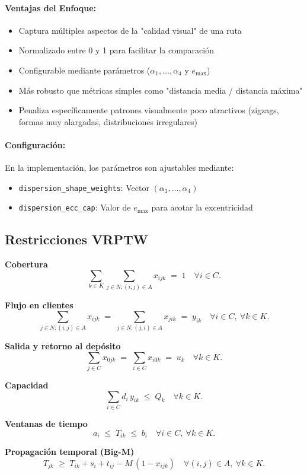 \documentclass[11pt, a4paper]{article}
\begin{document}
\paragraph{Ventajas del Enfoque:}
\begin{itemize}
\item Captura múltiples aspectos de la "calidad visual" de una ruta
\item Normalizado entre 0 y 1 para facilitar la comparación
\item Configurable mediante parámetros ($\alpha_1,\dots,\alpha_4$ y $e_{\max}$)
\item Más robusto que métricas simples como "distancia media / distancia máxima"
\item Penaliza específicamente patrones visualmente poco atractivos (zigzags, formas muy alargadas, distribuciones irregulares)
\end{itemize}

\paragraph{Configuración:} En la implementación, los parámetros son ajustables mediante:
\begin{itemize}
\item \texttt{dispersion\_shape\_weights}: Vector $(\alpha_1,\dots,\alpha_4)$
\item \texttt{dispersion\_ecc\_cap}: Valor de $e_{\max}$ para acotar la excentricidad
\end{itemize}

\subsection{Restricciones VRPTW}
\textbf{Cobertura}
\[
\sum_{k\in K}\sum_{j\in N:(i,j)\in A} x_{ijk} \;=\; 1 
\quad \forall i\in C.
\]

\textbf{Flujo en clientes}
\[
\sum_{j\in N:(i,j)\in A} x_{ijk} \;=\; \sum_{j\in N:(j,i)\in A} x_{jik} \;=\; y_{ik}
\quad \forall i\in C,\ \forall k\in K.
\]

\textbf{Salida y retorno al depósito}
\[
\sum_{j\in C} x_{0jk} \;=\; \sum_{i\in C} x_{i0k} \;=\; u_k \quad \forall k\in K.
\]

\textbf{Capacidad}
\[
\sum_{i\in C} d_i\,y_{ik} \;\le\; Q_k \quad \forall k\in K.
\]

\textbf{Ventanas de tiempo}
\[
a_i \;\le\; T_{ik} \;\le\; b_i \quad \forall i\in C,\ \forall k\in K.
\]

\textbf{Propagación temporal (Big-M)}
\[
T_{jk} \;\ge\; T_{ik} + s_i + t_{ij} - M\,(1 - x_{ijk})
\quad \forall (i,j)\in A,\ \forall k\in K.
\]
\end{document}
